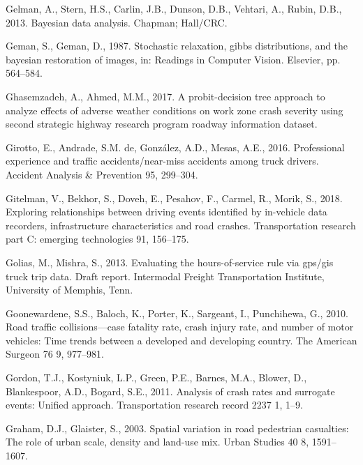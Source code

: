 \documentclass[12pt]{book}
\numberwithin{equation}{chapter}
\begin{document}
\leavevmode\hypertarget{ref-gelman2013bayesian}{}%
Gelman, A., Stern, H.S., Carlin, J.B., Dunson, D.B., Vehtari, A., Rubin, D.B., 2013. Bayesian data analysis. Chapman; Hall/CRC.

\leavevmode\hypertarget{ref-geman1987stochastic}{}%
Geman, S., Geman, D., 1987. Stochastic relaxation, gibbs distributions, and the bayesian restoration of images, in: Readings in Computer Vision. Elsevier, pp. 564--584.

\leavevmode\hypertarget{ref-ghasemzadeh2017probit}{}%
Ghasemzadeh, A., Ahmed, M.M., 2017. A probit-decision tree approach to analyze effects of adverse weather conditions on work zone crash severity using second strategic highway research program roadway information dataset.

\leavevmode\hypertarget{ref-girotto2016professional}{}%
Girotto, E., Andrade, S.M. de, González, A.D., Mesas, A.E., 2016. Professional experience and traffic accidents/near-miss accidents among truck drivers. Accident Analysis \& Prevention 95, 299--304.

\leavevmode\hypertarget{ref-gitelman2018exploring}{}%
Gitelman, V., Bekhor, S., Doveh, E., Pesahov, F., Carmel, R., Morik, S., 2018. Exploring relationships between driving events identified by in-vehicle data recorders, infrastructure characteristics and road crashes. Transportation research part C: emerging technologies 91, 156--175.

\leavevmode\hypertarget{ref-golias2013evaluating}{}%
Golias, M., Mishra, S., 2013. Evaluating the hours-of-service rule via gps/gis truck trip data. Draft report. Intermodal Freight Transportation Institute, University of Memphis, Tenn.

\leavevmode\hypertarget{ref-goonewardene2010road}{}%
Goonewardene, S.S., Baloch, K., Porter, K., Sargeant, I., Punchihewa, G., 2010. Road traffic collisions---case fatality rate, crash injury rate, and number of motor vehicles: Time trends between a developed and developing country. The American Surgeon 76 9, 977--981.

\leavevmode\hypertarget{ref-gordon2011analysis}{}%
Gordon, T.J., Kostyniuk, L.P., Green, P.E., Barnes, M.A., Blower, D., Blankespoor, A.D., Bogard, S.E., 2011. Analysis of crash rates and surrogate events: Unified approach. Transportation research record 2237 1, 1--9.

\leavevmode\hypertarget{ref-graham2003spatial}{}%
Graham, D.J., Glaister, S., 2003. Spatial variation in road pedestrian casualties: The role of urban scale, density and land-use mix. Urban Studies 40 8, 1591--1607.
\end{document}
